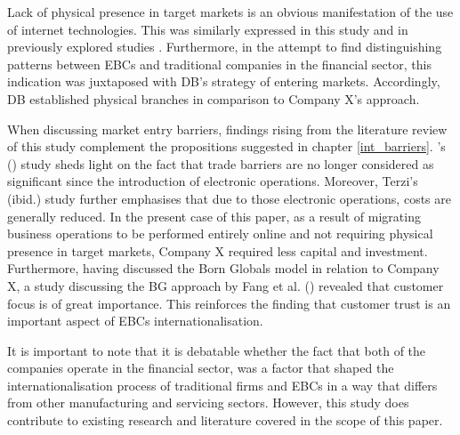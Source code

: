 \documentclass[11pt,a4paper]{article}
\begin{document}
{{{Lack of physical presence in target markets is an obvious manifestation of the use of internet technologies. This was similarly expressed in this study and in previously explored studies \parencite{loaneCrossnationalComparisonInternationalisation2002}. Furthermore, in the attempt to find distinguishing patterns between EBCs and traditional companies in the financial sector, this indication was juxtaposed with DB's strategy of entering markets. Accordingly, DB established physical branches in comparison to Company X's approach. \par
When discussing market entry barriers, findings rising from the literature review of this study complement the propositions suggested in chapter \ref{int_barriers}. \citeauthor{terziImpactEcommerceInternational2011}'s (\citeyear{terziImpactEcommerceInternational2011}) study sheds light on the fact that trade barriers are no longer considered as significant since the introduction of electronic operations. Moreover, Terzi's (ibid.) study further emphasises that due to those electronic operations, costs are generally reduced. In the present case of this paper, as a result of migrating business operations to be performed entirely online and not requiring physical presence in target markets, Company X required less capital and investment. Furthermore, having discussed the Born Globals model 
in relation to Company X, a study discussing the BG approach by Fang et al. (\citeyear{fangParachutingInternationalizationStudy2017}) revealed that customer focus is of great importance. This reinforces the finding that customer trust is an important aspect of EBCs internationalisation. \par
It is important to note that it is debatable whether the fact that both of the companies operate in the financial sector, was a factor that shaped the internationalisation process of traditional firms and EBCs in a way that differs from other manufacturing and servicing sectors. However, this study does contribute to existing research and literature covered in the scope of this paper.

\newpage
}}}
\end{document}
